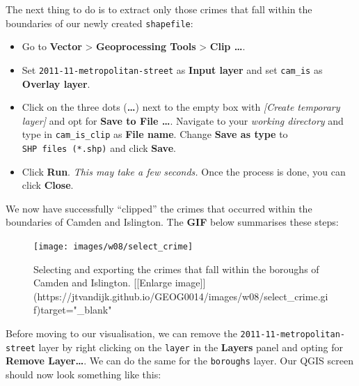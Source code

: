\documentclass[
]{book}
\providecommand{\tightlist}{%
  \setlength{\itemsep}{0pt}\setlength{\parskip}{0pt}}
\begin{document}
The next thing to do is to extract only those crimes that fall within the boundaries of our newly created \texttt{shapefile}:

\begin{itemize}
\tightlist
\item
  Go to \textbf{Vector} \textgreater{} \textbf{Geoprocessing Tools} \textgreater{} \textbf{Clip \ldots{}}.
\item
  Set \texttt{2011-11-metropolitan-street} as \textbf{Input layer} and set \texttt{cam\_is} as \textbf{Overlay layer}.
\item
  Click on the three dots (\textbf{\ldots{}}) next to the empty box with \emph{{[}Create temporary layer{]}} and opt for \textbf{Save to File \ldots{}}. Navigate to your \emph{working directory} and type in \texttt{cam\_is\_clip} as \textbf{File name}. Change \textbf{Save as type} to \texttt{SHP\ files\ (*.shp)} and click \textbf{Save}.
\item
  Click \textbf{Run}. \emph{This may take a few seconds.} Once the process is done, you can click \textbf{Close}.
\end{itemize}

We now have successfully ``clipped'' the crimes that occurred within the boundaries of Camden and Islington. The \textbf{GIF} below summarises these steps:

\begin{figure}

{\centering \texttt{[image: images/w08/select\_crime]} 

}

\caption{Selecting and exporting the crimes that fall within the boroughs of Camden and Islington. [[Enlarge image]](https://jtvandijk.github.io/GEOG0014/images/w08/select_crime.gif){target="_blank"}}\label{fig:select-crimes}
\end{figure}

Before moving to our visualisation, we can remove the \texttt{2011-11-metropolitan-street} layer by right clicking on the \texttt{layer} in the \textbf{Layers} panel and opting for \textbf{Remove Layer\ldots{}}. We can do the same for the \texttt{boroughs} layer. Our QGIS screen should now look something like this:
\end{document}

